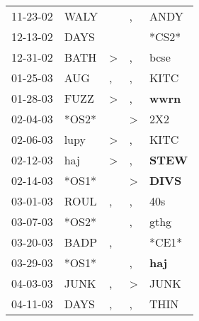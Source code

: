\begin{supertabular}{p{0.07\textwidth}p{0.06\textwidth}p{0.02\textwidth}p{0.02\textwidth}p{0.06\textwidth}}
          11-23-02\textsuperscript{} &           WALY\textsuperscript{} &                  &             , &           ANDY\textsuperscript{} \\
          12-13-02\textsuperscript{} &           DAYS\textsuperscript{} &                  &               &                            *CS2* \\
          12-31-02\textsuperscript{} &           BATH\textsuperscript{} &     \textgreater &             , &           bcse\textsuperscript{} \\
          01-25-03\textsuperscript{} &            AUG\textsuperscript{} &                , &             , &           KITC\textsuperscript{} \\
          01-28-03\textsuperscript{} &           FUZZ\textsuperscript{} &     \textgreater &             , &  \textbf{wwrn\textsuperscript{}} \\
          02-04-03\textsuperscript{} &                            *OS2* &                  &  \textgreater &            2X2\textsuperscript{} \\
          02-06-03\textsuperscript{} &           lupy\textsuperscript{} &     \textgreater &             , &           KITC\textsuperscript{} \\
          02-12-03\textsuperscript{} &            haj\textsuperscript{} &     \textgreater &             , &  \textbf{STEW\textsuperscript{}} \\
          02-14-03\textsuperscript{} &                            *OS1* &                  &  \textgreater &  \textbf{DIVS\textsuperscript{}} \\
          03-01-03\textsuperscript{} &           ROUL\textsuperscript{} &                , &             , &            40s\textsuperscript{} \\
          03-07-03\textsuperscript{} &                            *OS2* &                  &             , &           gthg\textsuperscript{} \\
          03-20-03\textsuperscript{} &           BADP\textsuperscript{} &                , &               &                            *CE1* \\
          03-29-03\textsuperscript{} &                            *OS1* &                  &             , &   \textbf{haj\textsuperscript{}} \\
          04-03-03\textsuperscript{} &           JUNK\textsuperscript{} &                , &  \textgreater &           JUNK\textsuperscript{} \\
          04-11-03\textsuperscript{} &           DAYS\textsuperscript{} &                , &             , &           THIN\textsuperscript{} \\

\end{supertabular}
